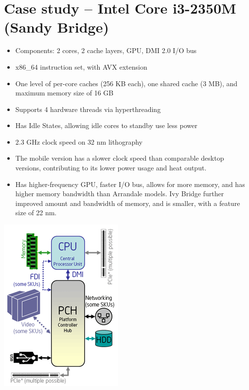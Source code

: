 \documentclass{article}
\begin{document}
\section{Case study -- Intel Core i3-2350M (Sandy Bridge)}
\begin{itemize}
  \item Components: 2 cores, 2 cache layers, GPU, DMI 2.0 I/O bus
  \item x86\_64 instruction set, with AVX extension
  \item One level of per-core caches (256 KB each), one shared cache (3 MB), and maximum memory size of 16 GB
  \item Supports 4 hardware threads via hyperthreading
  \item Has Idle States, allowing idle cores to standby use less power
  \item 2.3 GHz clock speed on 32 nm lithography
  \item The mobile version has a slower clock speed than comparable desktop versions, contributing to its lower power usage and heat output.
  \item Has higher-frequency GPU, faster I/O bus, allows for more memory, and has higher memory bandwidth than Arrandale models. Ivy Bridge further improved amount and bandwidth of memory, and is smaller, with a feature size of 22 nm.
\end{itemize}
\includegraphics{diagram-18}
\end{document}
